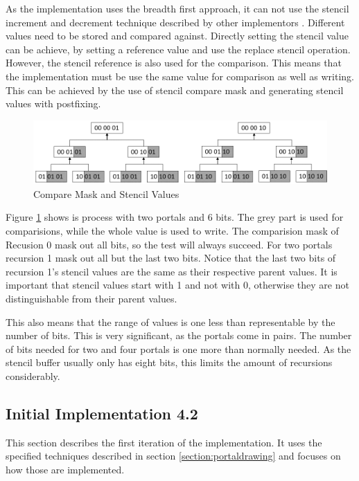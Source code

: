 As the implementation uses the breadth first approach, it can not use the stencil increment and decrement technique described by other implementors \cite{schmalstieg:1999:sewing, lowe:2003:fragment, lecture:portalProblems}. Different values need to be stored and compared against. Directly setting the stencil value can be achieve, by setting a reference value and use the replace stencil operation. However, the stencil reference is also used for the comparison. This means that the implementation must be use the same value for comparison as well as writing. This can be achieved by the use of stencil compare mask and generating stencil values with postfixing.

\begin{figure}[h]
	\includegraphics[width=\linewidth]{images/stencilvalues2.png}
	\caption{Compare Mask and Stencil Values}
	\label{fig:stencilvalues}
\end{figure}

Figure \ref{fig:stencilvalues} shows is process with two portals and 6 bits. The grey part is used for comparisions, while the whole value is used to write. The comparision mask of Recusion 0 mask out all bits, so the test will always succeed. For two portals recursion 1 mask out all but the last two bits. Notice that the last two bits of  recursion 1's stencil values are the same as their respective parent values. It is important that stencil values start with 1 and not with 0, otherwise they are not distinguishable from their parent values.

This also means that the range of values is one less than representable by the number of bits. This is very significant, as the portals come in pairs. The number of bits needed for two and four portals is one more than normally needed. As the stencil buffer usually only has eight bits, this limits the amount of recursions considerably.



\subsection{Initial Implementation 4.2}
\label{section:intialimplementation}
This section describes the first iteration of the implementation. It uses the specified techniques described in section \ref{section:portaldrawing} and focuses on how those are implemented.


